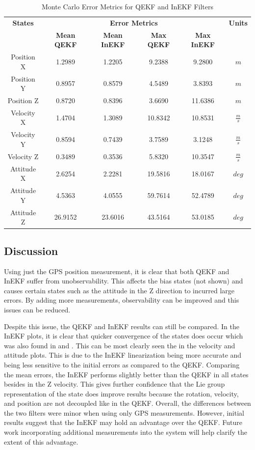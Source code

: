 \begin{table}[H]
\centering
\begin{tabular}{|c|c|c|c|c|c|}
    \hline
    \textbf{States} & \multicolumn{4}{|c|}{\textbf{Error Metrics}} & \textbf{Units} \\
    \cline{2-5}
    & \textbf{Mean QEKF} & \textbf{Mean InEKF} & \textbf{Max QEKF} & \textbf{Max InEKF} & \\
    \hline
    Position X & 1.2989 & 1.2205 & 9.2388 & 9.2800 & $m$ \\
    Position Y & 0.8957 & 0.8579 & 4.5489 & 3.8393 & $m$ \\
    Position Z & 0.8720 & 0.8396 & 3.6690 & 11.6386 & $m$ \\
    \hline
    Velocity X & 1.4704 & 1.3089 & 10.8342 & 10.8531 & $\frac{m}{s}$ \\
    Velocity Y & 0.8594 & 0.7439 & 3.7589 & 3.1248 & $\frac{m}{s}$ \\
    Velocity Z & 0.3489 & 0.3536 & 5.8320 & 10.3547 & $\frac{m}{s}$ \\
    \hline
    Attitude X & 2.6254 & 2.2281 & 19.5816 & 18.0167 & $deg$ \\
    Attitude Y & 4.5363 & 4.0555 & 59.7614 & 52.4789 & $deg$ \\
    Attitude Z & 26.9152 & 23.6016 & 43.5164 & 53.0185 & $deg$ \\
    \hline
\end{tabular}
\caption{Monte Carlo Error Metrics for QEKF and InEKF Filters}
\label{tab: error metrics}
\end{table}



\subsection{Discussion}
Using just the GPS position measurement, it is clear that both QEKF and InEKF suffer from unobservability. This affects the bias states (not shown) and causes certain states such as the attitude in the Z direction to incurred large errors. By adding more measurements, observability can be improved and this issues can be reduced.

Despite this issue, the QEKF and InEKF results can still be compared. In the InEKF plots, it is clear that quicker convergence of the states does occur which was also found in \cite{Contact-Aided_Invarant_EKF} and \cite{9444664}. This can be most clearly seen the in the velocity and attitude plots. This is due to the InEKF linearization being more accurate and being less sensitive to the initial errors as compared to the QEKF. Comparing the mean errors, the InEKF performs slightly better than the QEKF in all states besides in the Z velocity. This gives further confidence that the Lie group representation of the state does improve results because the rotation, velocity, and position are not decoupled like in the QEKF. Overall, the differences between the two filters were minor when using only GPS measurements. However, initial results suggest that the InEKF may hold an advantage over the QEKF. Future work incorporating additional measurements into the system will help clarify the extent of this advantage.

